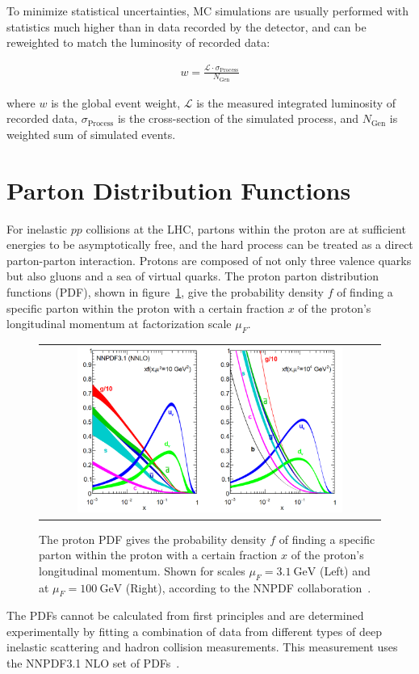 To minimize statistical uncertainties, MC simulations are usually performed with statistics much higher than in data recorded by the detector, and can be reweighted to match the luminosity of recorded data:
\begin{linenomath*}
\begin{align}
w = \frac{\mathcal{L} \cdot \sigma_{\text{Process}}}{N_{\text{Gen}}}
\end{align}
\end{linenomath*}
where $w$ is the global event weight, $\mathcal{L}$ is the measured integrated luminosity of recorded data, $\sigma_{\text{Process}}$ is the cross-section of the simulated process, and $N_{\text{Gen}}$ is weighted sum of simulated events.

\section{Parton Distribution Functions}
\label{sec:Parton_Distribution_Functions}
For inelastic $pp$ collisions at the LHC, partons within the proton are at sufficient energies to be asymptotically free, and the hard process can be treated as a direct parton-parton interaction.
Protons are composed of not only three valence quarks but also gluons and a sea of virtual quarks.
The proton parton distribution functions (PDF), shown in figure~\ref{Parton_Distribution_Functions}, give the probability density $f$ of finding a specific parton within the proton with a certain fraction $x$ of the proton's longitudinal momentum at factorization scale $\mu_F$.
\begin{figure}[htb]
  \begin{center}
    \begin{tabular}{c}
        \includegraphics[width=0.80\textwidth]{fig_Event_Simulation/Parton_Distribution_Functions.png}
    \end{tabular}
    \caption{The proton PDF gives the probability density $f$ of finding a specific parton within the proton with a certain fraction $x$ of the proton's longitudinal momentum.
    Shown for scales $\mu_F = \SI{3.1}{\GeV}$ (Left) and at $\mu_F = \SI{100}{\GeV}$ (Right), according to the NNPDF collaboration~\cite{Ball:2267455}.
            }
    \label{Parton_Distribution_Functions}
  \end{center}
\end{figure}
The PDFs cannot be calculated from first principles and are determined experimentally by fitting a combination of data from different types of deep inelastic scattering and hadron collision measurements.
This measurement uses the NNPDF3.1 NLO set of PDFs~\cite{Ball:2267455}.

